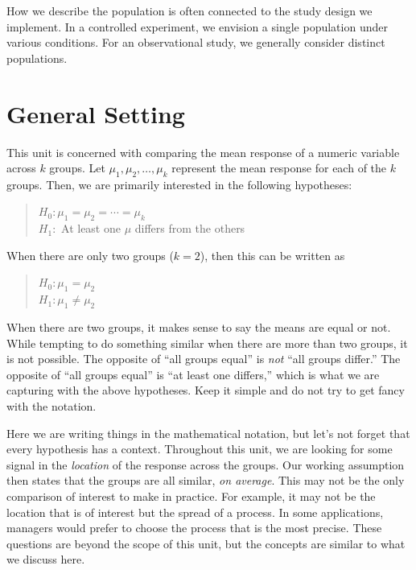 \documentclass[]{book}
\theoremstyle{plain}
\theoremstyle{mydefn}
\theoremstyle{myexmpl}
\theoremstyle{remark}
\let\BeginKnitrBlock\begin \let\EndKnitrBlock\end
\let\BeginKnitrBlock\begin \let\EndKnitrBlock\end
\begin{document}
\BeginKnitrBlock{rmdtip}
How we describe the population is often connected to the study design we
implement. In a controlled experiment, we envision a single population
under various conditions. For an observational study, we generally
consider distinct populations.
\EndKnitrBlock{rmdtip}

\section{General Setting}\label{general-setting}

This unit is concerned with comparing the mean response of a numeric
variable across \(k\) groups. Let \(\mu_1, \mu_2, \dotsc, \mu_k\)
represent the mean response for each of the \(k\) groups. Then, we are
primarily interested in the following hypotheses:

\begin{quote}
\(H_0: \mu_1 = \mu_2 = \dotsb = \mu_k\)\\
\(H_1:\) At least one \(\mu\) differs from the others
\end{quote}

When there are only two groups (\(k = 2\)), then this can be written as

\begin{quote}
\(H_0: \mu_1 = \mu_2\)\\
\(H_1: \mu_1 \neq \mu_2\)
\end{quote}

\BeginKnitrBlock{rmdtip}
When there are two groups, it makes sense to say the means are equal or
not. While tempting to do something similar when there are more than two
groups, it is not possible. The opposite of ``all groups equal'' is
\emph{not} ``all groups differ.'' The opposite of ``all groups equal''
is ``at least one differs,'' which is what we are capturing with the
above hypotheses. Keep it simple and do not try to get fancy with the
notation.
\EndKnitrBlock{rmdtip}

Here we are writing things in the mathematical notation, but let's not
forget that every hypothesis has a context. Throughout this unit, we are
looking for some signal in the \emph{location} of the response across
the groups. Our working assumption then states that the groups are all
similar, \emph{on average}. This may not be the only comparison of
interest to make in practice. For example, it may not be the location
that is of interest but the spread of a process. In some applications,
managers would prefer to choose the process that is the most precise.
These questions are beyond the scope of this unit, but the concepts are
similar to what we discuss here.
\end{document}
